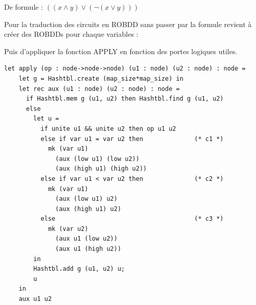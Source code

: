 \documentclass[a4paper, oneside]{report}
\begin{document}
De formule : $((x \wedge y) \vee (\neg(x \vee y)))$

\begin{figure}[h]
\end{figure}

Pour la traduction des circuits en ROBDD sans passer par la formule revient à créer des ROBDDs pour chaque variables :

\begin{figure}[h]
\end{figure}

Puis d'appliquer la fonction APPLY en fonction des portes logiques utiles.\\

\newpage

\begin{lstlisting}
let apply (op : node->node->node) (u1 : node) (u2 : node) : node =
    let g = Hashtbl.create (map_size*map_size) in
    let rec aux (u1 : node) (u2 : node) : node =
      if Hashtbl.mem g (u1, u2) then Hashtbl.find g (u1, u2)
      else
        let u =
          if unite u1 && unite u2 then op u1 u2
          else if var u1 = var u2 then              (* c1 *) 
            mk (var u1)
              (aux (low u1) (low u2)) 
              (aux (high u1) (high u2))
          else if var u1 < var u2 then              (* c2 *) 
            mk (var u1)
              (aux (low u1) u2) 
              (aux (high u1) u2)
          else                                      (* c3 *)
            mk (var u2)
              (aux u1 (low u2)) 
              (aux u1 (high u2))
        in 
        Hashtbl.add g (u1, u2) u;
        u
    in
    aux u1 u2
\end{lstlisting}
\end{document}
